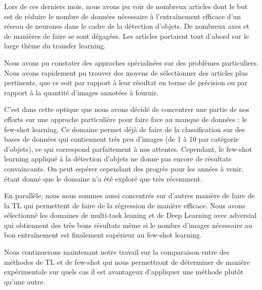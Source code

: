 
Lors de ces derniers mois, nous avons pu voir de nombreux articles dont le but est de réduire le nombre de données nécessaire à l'entraînement efficace d'un réseau de neurones dans le cadre de la détection d'objets. De nombreux axes et de manières de faire se sont dégagées. Les articles portaient tout d'abord sur le large thème du transfer learning.

Nous avons pu constater des approches spécialisées sur des problèmes particuliers. Nous avons rapidement pu trouver des moyens de sélectionner des articles plus pertinents, que ce soit par rapport à leur résultat en terme de précision ou par rapport à la quantité d'images annotées à fournir.

C'est dans cette optique que nous avons décidé de concentrer une partie de nos efforts sur une approche particulière pour faire face au manque de données : le few-shot learning. Ce domaine permet déjà de faire de la classification sur des bases de données qui contiennent très peu d'images (de 1 à 10 par catégorie d'objets), ce qui correspond parfaitement à nos attentes. Cependant, le few-shot learning appliqué à la détection d'objets ne donne pas encore de résultats convaincants. On peut espérer cependant des progrès pour les années à venir, étant donné que le domaine n'a été exploré que très récemment.

En parallèle, nous nous sommes aussi concentrés sur d'autres manière de faire de la TL qui permettent de faire de la régression de manière efficace. Nous avons sélectionné les domaines de multi-task leaning et de Deep Learning avec adversial qui obtiennent des très bons résultats même si le nombre d'images nécessaire au bon entraînement est finalement supérieur au few-shot learning.

Nous continuerons maintenant notre travail sur la comparaison entre des méthodes de TL et de few-shot qui nous permettront de déterminer de manière expérimentale sur quels cas il est avantageux d'appliquer une méthode plutôt qu'une autre.